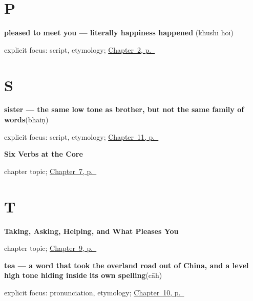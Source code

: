 \section*{P}

\noindent\begin{minipage}[t]{\linewidth}
\raggedright
\textbf{pleased to meet you — literally happiness happened}\enspace\emph{ }\enspace(khushī hoī)\par
\footnotesize explicit focus: script, etymology; \hyperref[ch:introductions]{Chapter~2, p.~\pageref*{ch:introductions}}
\end{minipage}\par\smallskip

\section*{S}

\noindent\begin{minipage}[t]{\linewidth}
\raggedright
\textbf{sister — the same low tone as brother, but not the same family of words}\enspace\emph{}\enspace(bhaiṇ)\par
\footnotesize explicit focus: script, etymology; \hyperref[ch:pa-friend-and-family]{Chapter~11, p.~\pageref*{ch:pa-friend-and-family}}
\end{minipage}\par\smallskip

\noindent\begin{minipage}[t]{\linewidth}
\raggedright
\textbf{Six Verbs at the Core}\par
\footnotesize chapter topic; \hyperref[ch:pa-core-verbs]{Chapter~7, p.~\pageref*{ch:pa-core-verbs}}
\end{minipage}\par\smallskip

\section*{T}

\noindent\begin{minipage}[t]{\linewidth}
\raggedright
\textbf{Taking, Asking, Helping, and What Pleases You}\par
\footnotesize chapter topic; \hyperref[ch:pa-taking-and-liking]{Chapter~9, p.~\pageref*{ch:pa-taking-and-liking}}
\end{minipage}\par\smallskip

\noindent\begin{minipage}[t]{\linewidth}
\raggedright
\textbf{tea — a word that took the overland road out of China, and a level high tone hiding inside its own spelling}\enspace\emph{}\enspace(cāh)\par
\footnotesize explicit focus: pronunciation, etymology; \hyperref[ch:pa-request-food-drink]{Chapter~10, p.~\pageref*{ch:pa-request-food-drink}}
\end{minipage}\par\smallskip

